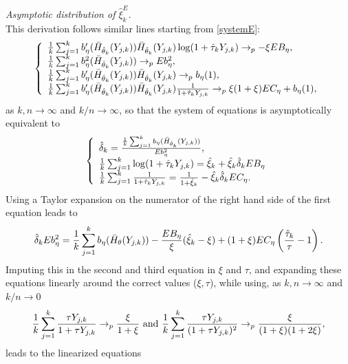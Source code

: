 \documentclass[twoside,leqno,11pt]{article}
\begin{document}
\vspace{0.3cm}\noindent
{\it Asymptotic distribution of 
$\hat{\xi}_k^{E}$}. \\ This derivation follows similar lines starting from \eqref{systemE}: 
 \[
\left\{
\begin{array}{l}
{1 \over k}\sum_{j=1}^k b'_{\eta}(\bar{H}_{\hat{\theta}_k}(Y_{j,k})) \bar{H}_{\hat{\theta}_k}(Y_{j,k}) \log (1+\hat{\tau}_k Y_{j,k}) \to_p -\xi EB_\eta, \\
{1 \over k}\sum_{j=1}^k b^2_\eta (\bar{H}_{\hat{\theta}_k}(Y_{j,k})) \to_p Eb^2_{\eta}, \\
{1\over k}\sum_{j=1}^k b'_{\eta}(\bar{H}_{\hat{\theta}_k}(Y_{j,k}))\bar{H}_{\hat{\theta}_k}(Y_{j,k}) \to_p b_\eta (1), \\
{1\over k}\sum_{j=1}^k b'_{\eta}(\bar{H}_{\hat{\theta}_k}(Y_{j,k}))\bar{H}_{\hat{\theta}_k}(Y_{j,k}) {1 \over 1+\hat{\tau}_k Y_{j,k}}
\to_p  \xi(1+\xi) EC_{\eta} + b_\eta (1),
\end{array}
\right.
\]
as $k,n\to \infty$ and $k/n\to \infty$,
so that the system of equations is asymptotically equivalent to
\[
\left\{
\begin{array}{l}
\hat{\delta}_k  = \frac{{1 \over k}\sum_{j=1}^k b_\eta (\bar{H}_{\hat{\theta}_k}(Y_{j,k}))}{Eb^2_{\eta}}, \\
{1 \over k}\sum_{j=1}^k \log (1+\hat{\tau}_k Y_{j,k}) = 
\hat{\xi}_k + \hat{\xi}_k\hat{\delta}_kEB_{\eta}
\\
{1 \over k}\sum_{j=1}^k {1 \over 1+\hat{\tau}_k Y_{j,k}} =
{1 \over 1+ \hat{\xi}_k}- \hat{\xi}_k\hat{\delta}_k EC_{\eta}.
\end{array}
\right.
\]
Using a Taylor expansion on the numerator of the right hand side of the first equation leads to
\[
\hat{\delta}_k Eb^2_{\eta}=
{1 \over k } \sum_{j=1}^kb_{\eta}(\bar{H}_{\theta}(Y_{j,k}))
- {EB_{\eta} \over \xi}(\hat{\xi}_k -\xi) 
+ (1+\xi) EC_{\eta} \left({\hat{\tau}_k \over \tau}-1 \right).
\]
Imputing this in the second and third equation in $\xi$ and $\tau$, and expanding these equations linearly around the correct values ($\xi,\tau$), while using, as $k,n \to \infty$ and $k/n \to 0$ 
\[
{1 \over k}\sum_{j=1}^k {\tau Y_{j,k} \over 1+\tau Y_{j,k}}
\to_p {\xi \over 1+\xi} \mbox{ and }{1 \over k}\sum_{j=1}^k {\tau Y_{j,k} \over (1+\tau Y_{j,k})^2} \to_p {\xi \over (1+\xi)(1+2\xi)}, \] 
leads to the linearized equations 
\end{document}
